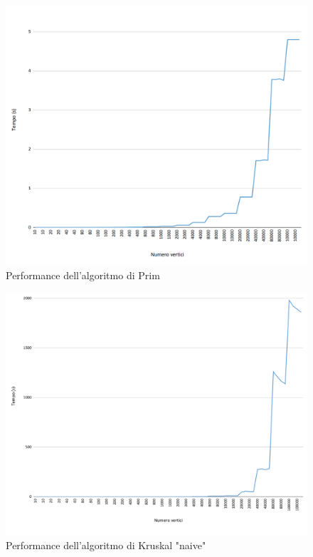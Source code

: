 \begin{figure}[H]
	\hspace{-1cm}\includegraphics[width=19cm]{Img/prim_result.png}
	\caption{Performance dell'algoritmo di Prim}
\end{figure}
\begin{figure}[H]
	\hspace{-1cm}\includegraphics[width=18.5cm]{Img/kruskal_naive_result.png}
	\caption{Performance dell'algoritmo di Kruskal "naive"}
\end{figure}


\pagebreak